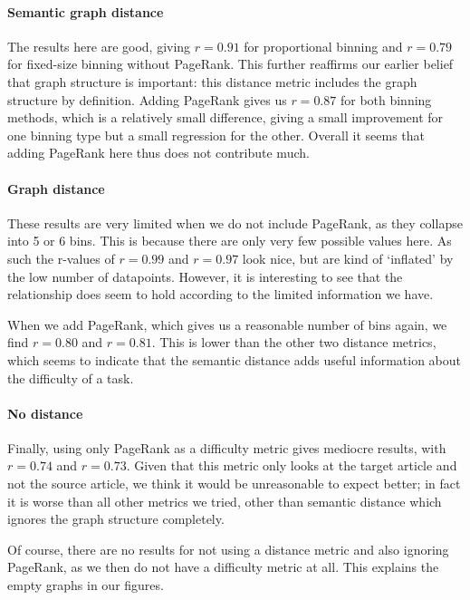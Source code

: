 \paragraph{Semantic graph distance}
The results here are good, giving $r = 0.91$ for proportional binning and $r = 0.79$ for fixed-size binning without PageRank. This further reaffirms our earlier belief that graph structure is important: this distance metric includes the graph structure by definition. Adding PageRank gives us $r = 0.87$ for both binning methods, which is a relatively small difference, giving a small improvement for one binning type but a small regression for the other. Overall it seems that adding PageRank here thus does not contribute much.

\paragraph{Graph distance}
These results are very limited when we do not include PageRank, as they collapse into 5 or 6 bins. This is because there are only very few possible values here. As such the r-values of $r = 0.99$ and $r = 0.97$ look nice, but are kind of `inflated' by the low number of datapoints. However, it is interesting to see that the relationship does seem to hold according to the limited information we have.

When we add PageRank, which gives us a reasonable number of bins again, we find $r = 0.80$ and $r = 0.81$. This is lower than the other two distance metrics, which seems to indicate that the semantic distance adds useful information about the difficulty of a task.

\paragraph{No distance}
Finally, using only PageRank as a difficulty metric gives mediocre results, with $r = 0.74$ and $r = 0.73$. Given that this metric only looks at the target article and not the source article, we think it would be unreasonable to expect better; in fact it is worse than all other metrics we tried, other than semantic distance which ignores the graph structure completely.

Of course, there are no results for not using a distance metric and also ignoring PageRank, as we then do not have a difficulty metric at all. This explains the empty graphs in our figures.


